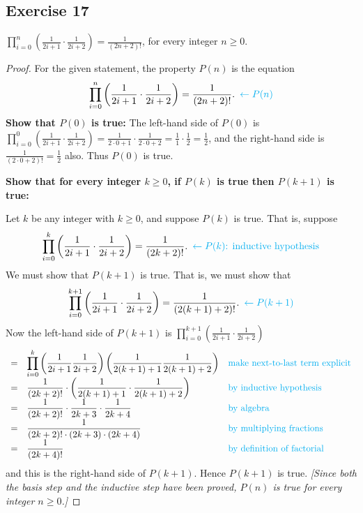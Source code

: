 \documentclass[14pt]{extarticle}
\newcommand{\dps}{\displaystyle}
\newcommand{\from}{\leftarrow}
\newcommand{\cy}{\color{cyan}}
\begin{document}
\subsection{Exercise 17}
$\dps \prod_{i=0}^{n}\left(\frac{1}{2i+1} \cdot \frac{1}{2i+2}\right) = \frac{1}{(2n+2)!}$, for every integer $n \geq 0$.

\begin{proof}
For the given statement, the property $P(n)$ is the equation
\[
\dps \prod_{i=0}^{n}\left(\frac{1}{2i+1} \cdot \frac{1}{2i+2}\right) = \frac{1}{(2n+2)!}. \,\,\, {\cy \from P(n)}
\]
{\bf Show that $P(0)$ is true:} The left-hand side of $P(0)$ is $\dps \prod_{i=0}^{0}\left(\frac{1}{2i+1} \cdot \frac{1}{2i+2}\right) = \frac{1}{2\cdot0+1} \cdot \frac{1}{2\cdot0+2} = \frac{1}{1}\cdot \frac{1}{2} = \frac{1}{2}$, and the right-hand side is $\dps \frac{1}{(2\cdot 0 +2)!} = \frac{1}{2}$ also. Thus $P(0)$ is true.

{\bf Show that for every integer $k \geq 0$, if $P(k)$ is true then $P(k + 1)$ is true:}

Let $k$ be any integer with $k \geq 0$, and suppose $P(k)$ is true. That is, suppose
\[
\dps \prod_{i=0}^{k}\left(\frac{1}{2i+1} \cdot \frac{1}{2i+2}\right) = \frac{1}{(2k+2)!}. \,\,\, {\cy \from P(k) \text{: inductive hypothesis}}
\]
We must show that $P(k + 1)$ is true. That is, we must show that
\[
\dps \prod_{i=0}^{k+1}\left(\frac{1}{2i+1} \cdot \frac{1}{2i+2}\right) = \frac{1}{(2(k+1)+2)!}. \,\,\,{\cy \from P(k+1)}
\]
Now the left-hand side of $P(k + 1)$ is $\dps \prod_{i=0}^{k+1}\left(\frac{1}{2i+1} \cdot \frac{1}{2i+2}\right)$
\[
\begin{array}{lll}
= & \dps \prod_{i=0}^{k}\left(\frac{1}{2i+1} \frac{1}{2i+2}\right) \left(\frac{1}{2(k+1)+1} \frac{1}{2(k+1)+2}\right) & \text{\cy make next-to-last term explicit} \\
= & \dps \frac{1}{(2k+2)!} \cdot \left(\frac{1}{2(k+1)+1} \cdot \frac{1}{2(k+1)+2}\right) & \text{\cy by inductive hypothesis} \\
= & \dps \frac{1}{(2k+2)!} \cdot \frac{1}{2k+3} \cdot \frac{1}{2k+4} & \text{\cy by algebra} \\
= & \dps \frac{1}{(2k+2)!\cdot(2k+3)\cdot(2k+4)} & \text{\cy by multiplying fractions} \\
= & \dps \frac{1}{(2k+4)!} & \text{\cy by definition of factorial}
\end{array}
\]
and this is the right-hand side of $P(k + 1)$. Hence $P(k + 1)$ is true. {\it [Since both the basis step and the inductive step have been proved, $P(n)$ is true for every integer $n \geq 0$.]}
\end{proof}
\end{document}
